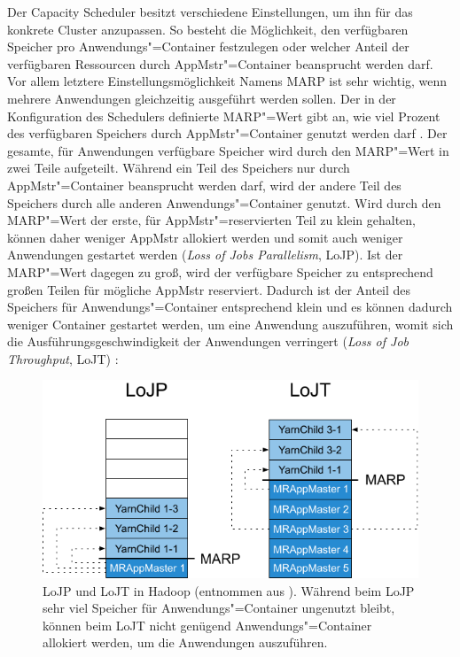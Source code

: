 Der Capacity Scheduler besitzt verschiedene Einstellungen, um ihn für das konkrete Cluster anzupassen.
So besteht \zB die Möglichkeit, den verfügbaren Speicher pro Anwendungs"=Container festzulegen oder welcher Anteil der verfügbaren Ressourcen durch \gls{AppMstr}"=Container beansprucht werden darf.
Vor allem letztere Einstellungsmöglichkeit Namens \gls{MARP} ist sehr wichtig, wenn mehrere Anwendungen gleichzeitig ausgeführt werden sollen.
Der in der Konfiguration des Schedulers definierte \gls{MARP}"=Wert gibt an, wie viel Prozent des verfügbaren Speichers durch \gls{AppMstr}"=Container genutzt werden darf \cite{HadoopCapScheduler271}.
Der gesamte, für Anwendungen verfügbare Speicher wird durch den \gls{MARP}"=Wert in zwei Teile aufgeteilt.
Während ein Teil des Speichers nur durch \gls{AppMstr}"=Container beansprucht werden darf, wird der andere Teil des Speichers durch alle anderen Anwendungs"=Container genutzt.
Wird durch den \gls{MARP}"=Wert der erste, für \gls{AppMstr}"=reservierten Teil zu klein gehalten, können daher weniger \gls{AppMstr} allokiert werden und somit auch weniger Anwendungen gestartet werden (\emph{Loss of Jobs Parallelism}, LoJP).
Ist der \gls{MARP}"=Wert dagegen zu groß, wird der verfügbare Speicher zu entsprechend großen Teilen für mögliche \gls{AppMstr} reserviert.
Dadurch ist der Anteil des Speichers für Anwendungs"=Container entsprechend klein und es können dadurch weniger Container gestartet werden, um eine Anwendung auszuführen, womit sich die Ausführungsgeschwindigkeit der Anwendungen verringert (\emph{Loss of Job Throughput}, LoJT) \cite{Zhang2016}:

\begin{figure}[h]
    \includegraphics{./resources/marpValue.pdf}
    \caption[LoJP und LoJT in Hadoop]
    {LoJP und LoJT in Hadoop (entnommen aus \cite{Zhang2016}).
        Während beim LoJP sehr viel Speicher für Anwendungs"=Container ungenutzt bleibt, können beim LoJT nicht genügend Anwendungs"=Container allokiert werden, um die Anwendungen auszuführen.}
    \label{fig:marpValue}
\end{figure}

